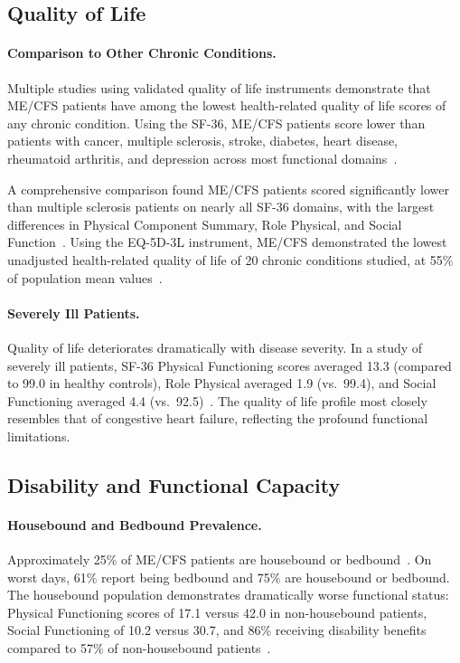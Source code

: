 \subsection{Quality of Life}
\label{subsec:qol}

\paragraph{Comparison to Other Chronic Conditions.}
Multiple studies using validated quality of life instruments demonstrate that ME/CFS patients have among the lowest health-related quality of life scores of any chronic condition. Using the SF-36, ME/CFS patients score lower than patients with cancer, multiple sclerosis, stroke, diabetes, heart disease, rheumatoid arthritis, and depression across most functional domains~\cite{Nacul2011qol,Hvidberg2015qol}.

A comprehensive comparison found ME/CFS patients scored significantly lower than multiple sclerosis patients on nearly all SF-36 domains, with the largest differences in Physical Component Summary, Role Physical, and Social Function~\cite{Kingdon2018qol}. Using the EQ-5D-3L instrument, ME/CFS demonstrated the lowest unadjusted health-related quality of life of 20 chronic conditions studied, at 55\% of population mean values~\cite{Hvidberg2015qol}.

\paragraph{Severely Ill Patients.}
Quality of life deteriorates dramatically with disease severity. In a study of severely ill patients, SF-36 Physical Functioning scores averaged 13.3 (compared to 99.0 in healthy controls), Role Physical averaged 1.9 (vs.\ 99.4), and Social Functioning averaged 4.4 (vs.\ 92.5)~\cite{Chang2021severe}. The quality of life profile most closely resembles that of congestive heart failure, reflecting the profound functional limitations.

\subsection{Disability and Functional Capacity}
\label{subsec:disability}

\paragraph{Housebound and Bedbound Prevalence.}
Approximately 25\% of ME/CFS patients are housebound or bedbound~\cite{Jason2017housebound}. On worst days, 61\% report being bedbound and 75\% are housebound or bedbound. The housebound population demonstrates dramatically worse functional status: Physical Functioning scores of 17.1 versus 42.0 in non-housebound patients, Social Functioning of 10.2 versus 30.7, and 86\% receiving disability benefits compared to 57\% of non-housebound patients~\cite{Jason2017housebound}.

